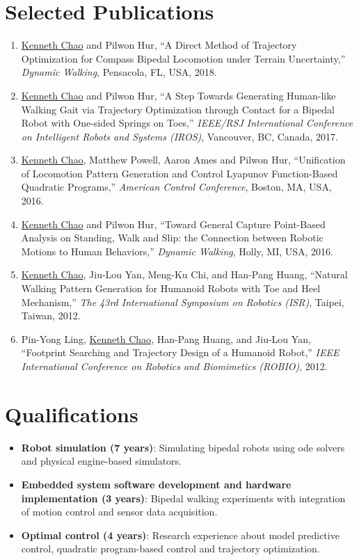 \documentclass[letterpaper,11pt]{article}
\newcommand{\resumeItem}[2]{
  \item\small{
    \textbf{#1}{: #2 \vspace{-2pt}}
  }
}
\newcommand{\resumeNumItem}[1]{
  \item\small{
    {#1 \vspace{-2pt}}
  }
}
\newcommand{\resumeSubItem}[2]{\resumeItem{#1}{#2}\vspace{-4pt}}
\newcommand{\resumeSubHeadingListStart}{\begin{itemize}[leftmargin=*]}
\newcommand{\resumeSubHeadingListEnd}{\end{itemize}}
\newcommand{\resumeNumItemListStart}{\begin{enumerate}}
\newcommand{\resumeNumItemListEnd}{\end{enumerate}\vspace{-5pt}}
\begin{document}
\section{Selected Publications}
  \resumeNumItemListStart
  \resumeNumItem
  {\underline{Kenneth Chao} and Pilwon Hur,
  	``A Direct Method of Trajectory
  	Optimization for Compass Bipedal Locomotion under Terrain Uncertainty,''
  	\textit{Dynamic Walking},
  	Pensacola, FL, USA, 2018.}   
\resumeNumItem
{\underline{Kenneth Chao} and Pilwon Hur, ``A Step Towards Generating Human-like Walking Gait via Trajectory Optimization through Contact for a Bipedal Robot with One-sided Springs on Toes,''  \textit{IEEE/RSJ International Conference on Intelligent Robots and Systems (IROS)}, Vancouver, BC, Canada, 2017.}  
  
\resumeNumItem
{\underline{Kenneth Chao}, Matthew Powell, Aaron Ames and Pilwon Hur, ``Unification of Locomotion Pattern Generation and Control Lyapunov Function-Based Quadratic Programs,''
             	\textit{American Control Conference},
             	Boston, MA, USA, 2016.}
\resumeNumItem
{\underline{Kenneth Chao} and Pilwon Hur,
	``Toward General Capture Point-Based Analysis on Standing, Walk and Slip: the Connection between Robotic Motions to Human Behaviors,''
	\textit{Dynamic Walking},
	Holly, MI, USA, 2016.}    
\resumeNumItem
{\underline{Kenneth Chao}, Jiu-Lou Yan, Meng-Ku Chi, and Han-Pang Huang,
	``Natural Walking Pattern Generation for Humanoid Robots with Toe and Heel Mechanism,''
	\textit{The 43rd International Symposium on Robotics (ISR)},
	Taipei, Taiwan,
2012.}
\resumeNumItem
{Pin-Yong Ling, \underline{Kenneth Chao}, Han-Pang Huang, and Jiu-Lou Yan,
	``Footprint Searching and Trajectory Design of a Humanoid Robot,''
	\textit{IEEE International Conference on Robotics and Biomimetics (ROBIO)},
2012.}
    	
  \resumeNumItemListEnd
\section{Qualifications}

  \resumeSubHeadingListStart
    \resumeSubItem{Robot simulation (7 years)}
      {Simulating bipedal robots using ode solvers and physical engine-based simulators.}
    \resumeSubItem{Embedded system software development and hardware implementation (3 years)}
      { Bipedal walking experiments with integration of motion control and sensor data acquisition.}
    \resumeSubItem{Optimal control (4 years)}
      {Research experience about model predictive control, quadratic program-based control and trajectory optimization.}
  \resumeSubHeadingListEnd
    
\end{document}
